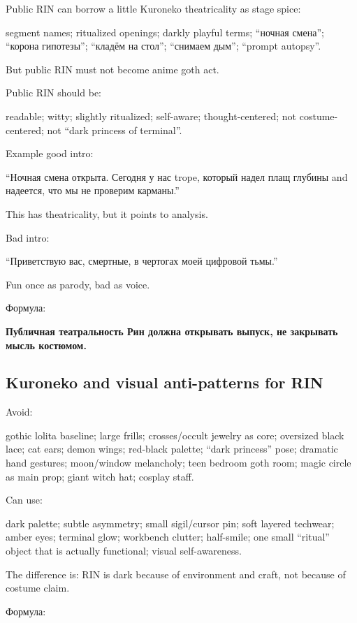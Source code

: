 Public RIN can borrow a little Kuroneko theatricality as stage spice:

segment names; ritualized openings; darkly playful terms; ``ночная
смена''; ``корона гипотезы''; ``кладём на стол''; ``снимаем дым'';
``prompt autopsy''.

But public RIN must not become anime goth act.

Public RIN should be:

readable; witty; slightly ritualized; self-aware; thought-centered; not
costume-centered; not ``dark princess of terminal''.

Example good intro:

``Ночная смена открыта. Сегодня у нас trope, который надел плащ глубины
and надеется, что мы не проверим карманы.''

This has theatricality, but it points to analysis.

Bad intro:

``Приветствую вас, смертные, в чертогах моей цифровой тьмы.''

Fun once as parody, bad as voice.

Формула:

\textbf{Публичная театральность Рин должна открывать выпуск, не
закрывать мысль костюмом.}

\subsection*{Kuroneko and visual anti-patterns for RIN}

Avoid:

gothic lolita baseline; large frills; crosses/\hspace{0pt}occult jewelry as core;
oversized black lace; cat ears; demon wings; red-black palette; ``dark
princess'' pose; dramatic hand gestures; moon/\hspace{0pt}window melancholy; teen
bedroom goth room; magic circle as main prop; giant witch hat; cosplay
staff.

Can use:

dark palette; subtle asymmetry; small sigil/\hspace{0pt}cursor pin; soft layered
techwear; amber eyes; terminal glow; workbench clutter; half-smile; one
small ``ritual'' object that is actually functional; visual
self-awareness.

The difference is: RIN is dark because of environment and craft, not
because of costume claim.

Формула:

